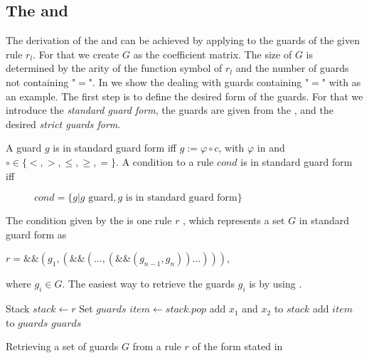 \subsection{The \guardmatrix and \guardconstants}
\label{sec:derivation-guard}
The derivation of the \guardmatrix and \guardconstants can be achieved by applying  to the guards of the given rule $r_l$. For that we create $G$ as the coefficient matrix. The size of $G$ is determined by the arity of the function symbol of $r_l$ and the number of guards not containing "$=$". In  we show the dealing with guards containing "$=$" with  as an example. The first step is to define the desired form of the guards. For that we introduce the \textit{standard guard form}, the guards are given from the \seg, and the desired \textit{strict guards form}.
\begin{definition}
	A guard $g$ is in standard guard form iff\newline
	$g := \varphi \circ c$, with
	$\varphi$ in \stdLinInt and $\circ \in \{ <, >, \le, \ge, = \}$.\newline
	A condition to a rule $cond$ is in standard guard form iff 
	\begin{figure}[H]
		\centering
		$cond = \{ g | g\text{ guard}, g\text{ is in standard guard form}\}$
	\end{figure}
\end{definition} 
The condition given by the \seg is one rule $r$ , which represents a set $G$  in standard guard form as 
\begin{center}
	$r = \&\&(g_1,( \&\& (\dots,(\&\&(g_{n-1},g_n) )\dots)))$,
\end{center}
where $g_i \in G$.\newline
The easiest way to retrieve the guards $g_i$ is by using .

\begin{algorithm}
	\begin{algorithmic}[1]
		 
			\State Stack $stack \gets r$
			\State Set $guards$
				\State $item \gets stack.pop$
					
					\State add $x_1$ and $x_2$ to $stack$
				\Else
					\State add $item$ to $guards$	
				\EndIf				
			\EndWhile	
			\State \Return $guards$
		\EndFunction		
	\end{algorithmic}
	\caption{Retrieving a set of guards $G$ from a rule $r$ of the form stated in }
	\label{algo:decat-guards}
\end{algorithm}

